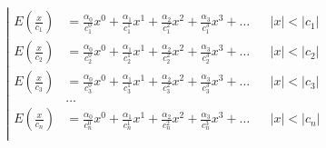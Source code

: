 \begin{equation*} \left| \begin{aligned}
E{\left(\frac{x}{c_1} \right)} &=
  \frac{\alpha_0}{c_1^0} x^0
+ \frac{\alpha_1}{c_1^1} x^1
+ \frac{\alpha_2}{c_1^2} x^2
+ \frac{\alpha_3}{c_1^3} x^3
+ \ldots &
&|x| < |c_1| \\
%
E{\left(\frac{x}{c_2} \right)} &=
  \frac{\alpha_0}{c_2^0} x^0
+ \frac{\alpha_1}{c_2^1} x^1
+ \frac{\alpha_2}{c_2^2} x^2
+ \frac{\alpha_3}{c_2^3} x^3
+ \ldots &
&|x| < |c_2| \\
%
E{\left(\frac{x}{c_3} \right)} &=
  \frac{\alpha_0}{c_3^0} x^0
+ \frac{\alpha_1}{c_3^1} x^1
+ \frac{\alpha_2}{c_3^2} x^2
+ \frac{\alpha_3}{c_3^3} x^3
+ \ldots &
&|x| < |c_3| \\
%
&\ldots \\
%
E{\left(\frac{x}{c_n} \right)} &=
  \frac{\alpha_0}{c_n^0} x^0
+ \frac{\alpha_1}{c_n^1} x^1
+ \frac{\alpha_2}{c_n^2} x^2
+ \frac{\alpha_3}{c_n^3} x^3
+ \ldots &
&|x| < |c_n| \\
\end{aligned} \right. \end{equation*}

